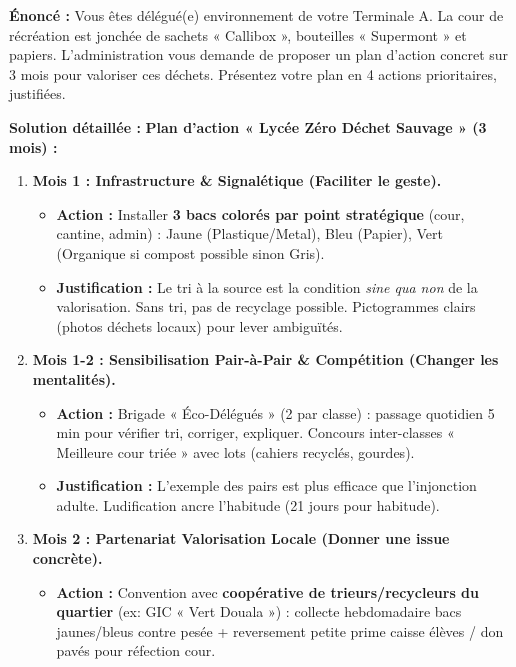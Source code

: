 \documentclass[11pt]{article}
\begin{document}
\begin{exoresolu}
\textbf{Énoncé :} Vous êtes délégué(e) environnement de votre Terminale A. La cour de récréation est jonchée de sachets « Callibox », bouteilles « Supermont » et papiers. L'administration vous demande de proposer un plan d'action concret sur 3 mois pour valoriser ces déchets. Présentez votre plan en 4 actions prioritaires, justifiées.

\tcblower

\textbf{Solution détaillée :}
\textbf{Plan d'action « Lycée Zéro Déchet Sauvage » (3 mois) :}
\begin{enumerate}
    \item \textbf{Mois 1 : Infrastructure \& Signalétique (Faciliter le geste).}
    \begin{itemize}
        \item \textbf{Action :} Installer \textbf{3 bacs colorés par point stratégique} (cour, cantine, admin) : Jaune (Plastique/Metal), Bleu (Papier), Vert (Organique si compost possible sinon Gris).
        \item \textbf{Justification :} Le tri à la source est la condition \emph{sine qua non} de la valorisation. Sans tri, pas de recyclage possible. Pictogrammes clairs (photos déchets locaux) pour lever ambiguïtés.
    \end{itemize}
    \item \textbf{Mois 1-2 : Sensibilisation Pair-à-Pair \& Compétition (Changer les mentalités).}
    \begin{itemize}
        \item \textbf{Action :} Brigade « Éco-Délégués » (2 par classe) : passage quotidien 5 min pour vérifier tri, corriger, expliquer. Concours inter-classes « Meilleure cour triée » avec lots (cahiers recyclés, gourdes).
        \item \textbf{Justification :} L'exemple des pairs est plus efficace que l'injonction adulte. Ludification ancre l'habitude (21 jours pour habitude).
    \end{itemize}
    \item \textbf{Mois 2 : Partenariat Valorisation Locale (Donner une issue concrète).}
    \begin{itemize}
        \item \textbf{Action :} Convention avec \textbf{coopérative de trieurs/recycleurs du quartier} (ex: GIC « Vert Douala ») : collecte hebdomadaire bacs jaunes/bleus contre pesée + reversement petite prime caisse élèves / don pavés pour réfection cour.

\end{itemize}
\end{enumerate}
\end{exoresolu}
\end{document}
